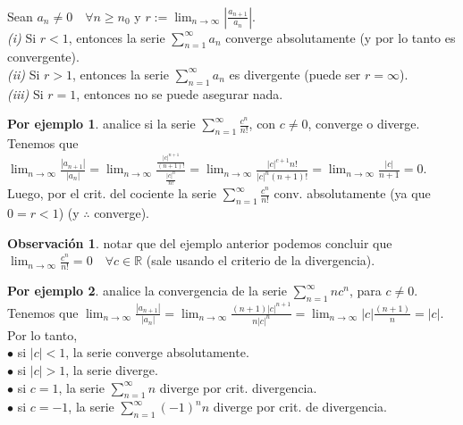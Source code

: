 \documentclass{article}
\theoremstyle{definition}
\theoremstyle{definition}
\newtheorem*{obs}{Observación}
\newtheorem*{ej}{Por ejemplo}
\theoremstyle{remark}
\begin{document}
\begin{teo} \; \\
Sean $a_n \neq 0 \quad \forall n \geq n_0$ y $r := \lim_{n\to\infty}{ \left| \frac{a_{n+1}}{a_n} \right|}$. \\ 
\emph{(i)} \quad Si $r<1$, entonces la serie $\sum_{n=1}^{\infty}{a_n}$ converge absolutamente (y por lo tanto es convergente). \\
\emph{(ii)} \quad Si $r>1$, entonces la serie $\sum_{n=1}^{\infty}{a_n}$ es divergente (puede ser $r=\infty$). \\
\emph{(iii)} \quad Si $r=1$, entonces no se puede asegurar nada.
\end{teo}


\begin{ej} analice si la serie $\sum_{n=1}^{\infty}{\frac{c^n}{n!}}$, con $c\neq0$, converge o diverge. \\
  Tenemos que $\lim_{n\to\infty}{\frac{|a_{n+1}|}{|a_n|}}=\lim_{n\to\infty}{\frac{\frac{|c|^{n+1}}{(n+1)!}}{\frac{|c|^n}{n!}}}=\lim_{n\to\infty}{\frac{|c|^{c+1}n!}{|c|^n(n+1)!}}=\lim_{n\to\infty}{\frac{|c|}{n+1}}=0.$ \\ Luego, por el crit. del cociente la serie $\sum_{n=1}^{\infty}{\frac{c^n}{n!}}$ conv. absolutamente (ya que $0 = r < 1$) (y $\therefore$ converge). \\
\end{ej}

\begin{obs}
  notar que del ejemplo anterior podemos concluir que \\$\lim_{n\to\infty}{\frac{c^n}{n!}}=0 \quad \forall c \in \mathbb{R}$ (sale usando el criterio de la divergencia).
\end{obs}

\pagebreak
\begin{ej}
  analice la convergencia de la serie $\sum_{n=1}^{\infty}{nc^n}$, para $c \neq 0$. \\
  Tenemos que $\lim_{n\to\infty}{\frac{|a_{n+1}|}{|a_n|}}=\lim_{n\to\infty}{\frac{(n+1)|c|^{n+1}}{n|c|^n}}=\lim_{n\to\infty}{|c| \frac{(n+1)}{n}}=|c|.$ Por lo tanto, \\
  $\bullet$ \quad si $|c| < 1$, la serie converge absolutamente. \\
  $\bullet$ \quad si $|c| > 1$, la serie diverge. \\
  $\bullet$ \quad si $c=1$, la serie $\sum_{n=1}^{\infty}{n}$ diverge por crit. divergencia. \\
  $\bullet$ \quad si $c=-1$, la serie $\sum_{n=1}^{\infty}{(-1)^nn}$ diverge por crit. de divergencia.
\end{ej}
\end{document}

